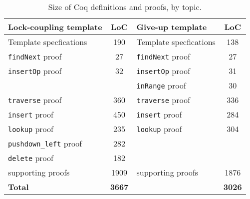 \documentclass[a4paper,UKenglish,cleveref, autoref, thm-restate]{lipics-v2021}
\newcommand{\wm}[1]{\textbf{\textcolor{violet}{[William: #1]}}}
\begin{document}
\begin{table}[h]
	\begin{center}
		\begin{tabular}{l | c || l | c } 
			\hline
			\textbf{Lock-coupling template} & \textbf{LoC} & \textbf{Give-up  template} & \textbf{LoC} \\
			\hline
			Template specfications & 190 & Template specfications & 138 \\
			\texttt{findNext} proof 	& 27  & \texttt{findNext} proof & 27 \\
			\texttt{insertOp} proof 	& 32  & \texttt{insertOp} proof & 31 \\
			& & \texttt{inRange} proof & 30 \\
			\texttt{traverse} proof	& 360  & \texttt{traverse} proof & 336 \\ 
			\texttt{insert} proof 	   		& 450  & \texttt{insert} proof & 284 \\
			\texttt{lookup} proof 	   	& 235  &  \texttt{lookup} proof & 304 \\ 
			\texttt{pushdown\_left} proof 	   	& 282 & & \\	
			\texttt{delete} proof 		& 182	 &   & 	 \\
			supporting proofs    & 	1909	 & supporting proofs 	& 1876 \\
			\hline
			\textbf{Total} & \textbf{3667} & & \textbf{3026}  
		\end{tabular}
		\caption{Size of Coq definitions and proofs, by topic.}
		\label{table_coq}
	\end{center}
\end{table}

\end{document}
